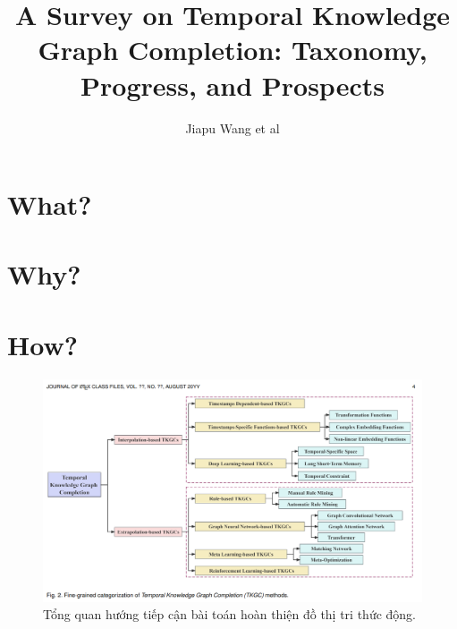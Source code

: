 \documentclass[12pt]{article}
\begin{document}
\title{A Survey on Temporal Knowledge Graph Completion: Taxonomy, Progress, and Prospects}
\author{Jiapu Wang et al}
\maketitle


\section{What?}


\section{Why?}


\section{How?}

\begin{figure}[h!]
    \includegraphics[width=1.1\linewidth]{figures/survey_wang2023_fig01.png}
    \caption{Tổng quan hướng tiếp cận bài toán hoàn thiện đồ thị tri thức động.}
    \label{fig:overview_med_approaches}
\end{figure}
\end{document}
